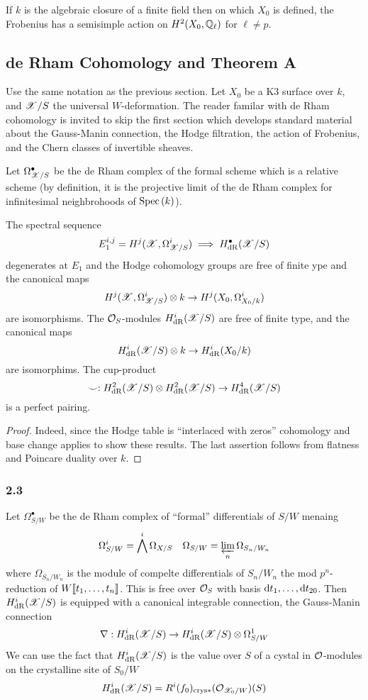 \documentclass[12pt]{article}
\begin{document}
\begin{cor}
If $k$ is the algebraic closure of a finite field then on which $X_0$ is defined, the Frobenius has a semisimple action on $H^2(X_0, \mathbb{Q}_{\ell})$ for $\ell \neq p$.
\end{cor}

\subsection{de Rham Cohomology and Theorem A}

Use the same notation as the previous section. Let $X_0$ be a K3 surface over $k$, and $\mathscr{X} / S$ the universal $W$-deformation. The reader familar with de Rham cohomology is invited to skip the first section which develops standard material about the Gauss-Manin connection, the Hodge filtration, the action of Frobenius, and the Chern classes of invertible sheaves.
\par 
Let $\Omega_{\mathscr{X}/S}^\bullet$ be the de Rham complex of the formal scheme which is a relative scheme (by definition, it is the projective limit of the de Rham complex for infinitesimal neighbrohoods of $\mathrm{Spec}\left( k \right)$).

\begin{prop}
The spectral sequence
\[ E_1^{i,j} = H^j(\mathscr{X}, \Omega_{\mathscr{X}/S}^i) \implies H^\bullet_{\mathrm{dR}}(\mathscr{X} / S) \]
degenerates at $E_1$ and the Hodge cohomology groups are free of finite ype and the canonical maps
\[ H^j(\mathscr{X}, \Omega^i_{\mathscr{X}/S}) \otimes k \to H^j(X_0, \Omega^i_{X_0/k}) \]
are isomorphisms. The $\mathcal{O}_{S}$-modules $H^i_{\mathrm{dR}}(\mathscr{X}/S)$ are free of finite type, and the canonical maps
\[ H^i_{\mathrm{dR}}(\mathscr{X}/S) \otimes k \to H^i_{\mathrm{dR}}(X_0/k) \]
are isomorphims. The cup-product
\[ \smile : H^2_{\mathrm{dR}}(\mathscr{X}/S) \otimes H^2_{\mathrm{dR}}(\mathscr{X}/S) \to H^4_{\mathrm{dR}}(\mathscr{X}/S) \]
is a perfect pairing. 
\end{prop}

\begin{proof}
Indeed, since the Hodge table is ``interlaced with zeros'' cohomology and base change applies to show these results. The last assertion follows from flatness and Poincare duality over $k$.
\end{proof}

\subsubsection{2.3}

Let $\Omega^\bullet_{S/W}$ be the de Rham complex of ``formal'' differentials of $S/W$ menaing
\[ \Omega^i_{S/W} = \bigwedge^i \Omega_{X/S} \quad \Omega_{S/W} = \operatorname*{\varprojlim}_n \Omega_{S_n/W_n} \]
where $\Omega_{S_n/W_n}$ is the module of compelte differentials of $S_n / W_n$ the mod $p^n$-reduction of $W \llbracket t_1, \dots, t_n \rrbracket$. This is free over $\mathcal{O}_{S}$ with basis $\mathrm{d}{t_1}, \dots, \mathrm{d}{t_{20}}$. Then $H^i_{\mathrm{dR}}(\mathscr{X}/S)$ is equipped with a canonical integrable connection, the Gauss-Manin connection
\[ \nabla : H^i_{\mathrm{dR}}(\mathscr{X}/S) \to H^i_{\mathrm{dR}}(\mathscr{X}/S) \otimes \Omega^1_{S/W} \]
We can use the fact that $H^i_{\mathrm{dR}}(\mathscr{X}/S)$ is the value over $S$ of a cystal in $\mathcal{O}_{}$-modules on the crystalline site of $S_0/W$
\[ H^i_{\mathrm{dR}}(\mathscr{X}/S) = R^i (f_0)_{\text{crys}*} (\mathcal{O}_{\mathscr{X}_0/W})(S) \]
\end{document}
